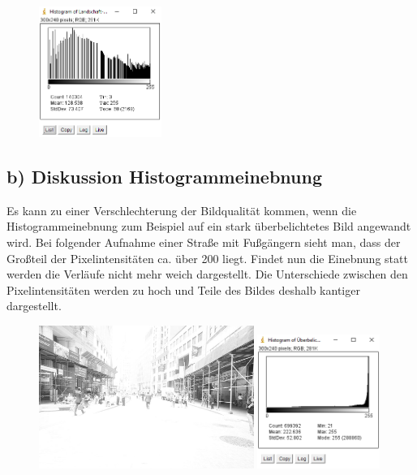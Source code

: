 \documentclass[12pt,german]{article}
\begin{document}
\begin{enumerate}
\begin{figure}[h!]
	\includegraphics[width=4cm]{../testData/Results/Landschaft/Landschaft-equalized-histogram.png}
\end{figure}


\end{enumerate}


\pagebreak
\subsection {b) Diskussion Histogrammeinebnung}
Es kann zu einer Verschlechterung der Bildqualität kommen, wenn die Histogrammeinebnung zum Beispiel auf ein stark überbelichtetes Bild angewandt wird. Bei folgender Aufnahme einer Straße mit Fußgängern sieht man, dass der Großteil der Pixelintensitäten ca. über 200 liegt. Findet nun die Einebnung statt werden die Verläufe nicht mehr weich dargestellt. Die Unterschiede zwischen den Pixelintensitäten werden zu hoch und Teile des Bildes deshalb kantiger dargestellt.
\begin{figure}[h!] \centering
	\includegraphics[width=7cm]{../testData/Results/Ueberbelichtung/Ueberbelichtung.jpg}
	\includegraphics[width=4cm]{../testData/Results/Ueberbelichtung/Ueberbelichtung-histogram.png}
\end{figure}
\end{document}
